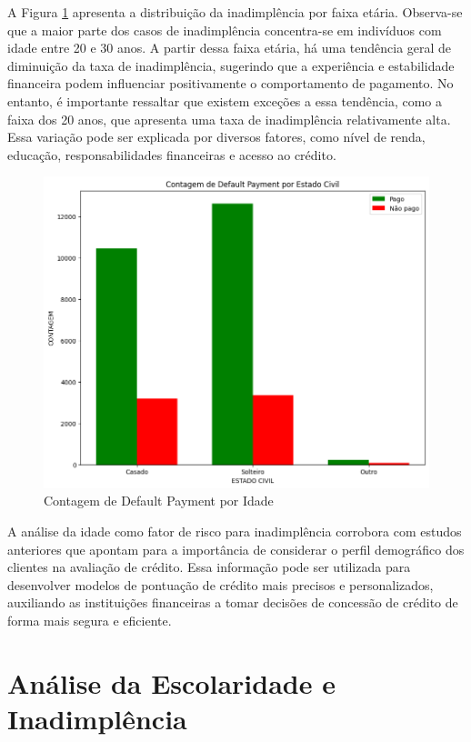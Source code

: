 \documentclass{abntpuc}
\begin{document}
A Figura \ref{fig:grafico2} apresenta a distribuição da inadimplência por faixa etária. Observa-se que a maior parte dos casos de inadimplência concentra-se em indivíduos com idade entre 20 e 30 anos. A partir dessa faixa etária, há uma tendência geral de diminuição da taxa de inadimplência, sugerindo que a experiência e estabilidade financeira podem influenciar positivamente o comportamento de pagamento. No entanto, é importante ressaltar que existem exceções a essa tendência, como a faixa dos 20 anos, que apresenta uma taxa de inadimplência relativamente alta. Essa variação pode ser explicada por diversos fatores, como nível de renda, educação, responsabilidades financeiras e acesso ao crédito.

\begin{figure}[H]
    \centering
    \includegraphics[width=\textwidth]{grafico2.png}
    \caption{Contagem de Default Payment por Idade}
    \label{fig:grafico2}
\end{figure}

A análise da idade como fator de risco para inadimplência corrobora com estudos anteriores que apontam para a importância de considerar o perfil demográfico dos clientes na avaliação de crédito. Essa informação pode ser utilizada para desenvolver modelos de pontuação de crédito mais precisos e personalizados, auxiliando as instituições financeiras a tomar decisões de concessão de crédito de forma mais segura e eficiente.

\section{Análise da Escolaridade e Inadimplência}
\end{document}
